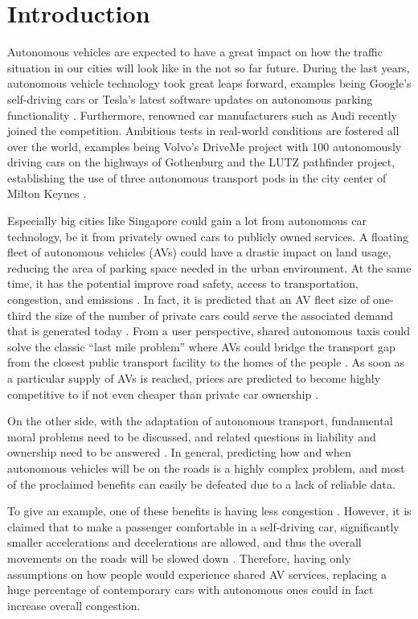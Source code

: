 \section{Introduction}

Autonomous vehicles are expected to have a great impact on how the traffic situation
in our cities will look like in the not so far future. During the last years, autonomous
vehicle technology took great leaps forward, examples being Google's self-driving cars
\citep{Google2016} or Tesla's latest software updates on autonomous parking functionality \citep{Tesla2016}.
Furthermore, renowned car manufacturers such as Audi recently joined the competition.
Ambitious tests in real-world conditions are fostered all over the world, examples being Volvo's
DriveMe project with 100 autonomously driving cars on the highways of Gothenburg \citep{Gothenburg2016}
and the LUTZ pathfinder project, establishing the use of three autonomous transport pods
in the city center of Milton Keynes \citep{MiltonKeynes2016}.

Especially big cities like Singapore could gain a lot from autonomous car technology,
be it from privately owned cars to publicly owned services. A floating fleet of
autonomous vehicles (AVs) could have a drastic impact on land usage, reducing the area of parking
space needed in the urban environment. At the same time, it has the potential improve road safety, access to transportation,
congestion, and emissions \citep{Kheong2014}. In fact, it is predicted
that an AV fleet size of one-third the size of the number of private cars could
serve the associated demand that is generated today \citep{Spieser2014}. From a user perspective, shared autonomous taxis could solve the classic ``last mile problem'' where AVs could
bridge the transport gap from the closest public transport facility to the homes
of the people \citep{Litman2014}. As soon as a particular supply of AVs is reached, prices are predicted
to become highly competitive to if not even cheaper than private car ownership \citep{Chen16}.

On the other side, with the adaptation of autonomous transport, fundamental moral
problems \citep{Hevelke2015a} need to be discussed, and related questions in liability and
ownership need to be answered \citep{Anderson2014a}. In general, predicting how and when autonomous
vehicles will be on the roads is a highly complex problem, and most of the proclaimed
benefits can easily be defeated due to a lack of reliable data.

To give an example, one of these benefits is having less congestion \citep{ITF2014}. However,
it is claimed that to make a passenger comfortable in a self-driving car,
significantly smaller accelerations and decelerations are allowed, and thus the
overall movements on the roads will be slowed down \citep{LeVine2015}. Therefore, having only assumptions
on how people would experience shared AV services, replacing a huge percentage of
contemporary cars with autonomous ones could in fact increase overall congestion.

